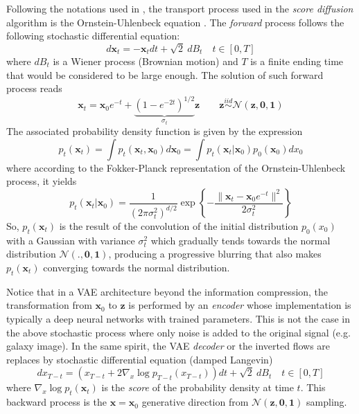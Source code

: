 \documentclass[11pt]{amsart}
\begin{document}
Following the notations used in \cite{kadkhodaie2024generalization}, the transport process used in the \textit{score diffusion} algorithm is the Ornstein-Uhlenbeck equation \citep{Uhlenbeck1930}. The \textit{forward} process follows the following stochastic differential equation:
\begin{equation}
d\bm{x}_t = -\bm{x}_t dt + \sqrt{2}\ dB_t \quad t\in[0,T]
\label{eq-Ornstein-cont}
\end{equation}
where $dB_t$ is a Wiener process (Brownian motion) and $T$ is a finite ending time that would be considered to be large enough. The solution of such forward process reads
\begin{equation}
\bm{x}_t = \bm{x}_0 e^{-t} + \underbrace{(1-e^{-2t})^{1/2}}_{\sigma_t} \bm{z} \qquad \bm{z} \overset{iid}{\sim} \mathcal{N}(\bm{z},\bm{0},\bm{1})
\end{equation}
The associated probability density function is given by the expression 
\begin{equation}
p_t(\bm{x}_t) = \int p_t(\bm{x}_t,\bm{x}_0) d\bm{x}_0 = \int p_t(\bm{x}_t|\bm{x}_0) p_0(\bm{x}_0)dx_0
\label{eq-smoothing-p0-gauss}
\end{equation}
where according to the Fokker-Planck representation of the Ornstein-Uhlenbeck process,  it yields
\begin{equation}
p_t(\bm{x}_t|\bm{x}_0)= \frac{1}{(2\pi \sigma_t^2)^{d/2}}\exp\left\{\displaystyle -\frac{\|\bm{x}_t-\bm{x}_0e^{-t}\|^2}{2\sigma_t^2}\right\}
\end{equation}
So, $p_t(\bm{x}_t)$ is the result of the convolution of the initial distribution $p_0(x_0)$ with a Gaussian with variance $\sigma_t^2$ which gradually tends towards the normal distribution $\mathcal{N}(.,\bm{0},\bm{1})$, producing a progressive blurring that also makes $p_t(\bm{x}_t)$ converging towards the normal distribution. 


Notice that in a VAE architecture beyond the information compression,  the transformation from $\bm{x}_0$ to $\bm{z}$ is performed by an \textit{encoder} whose implementation is typically a deep neural networks with trained parameters. This is not the case in the above stochastic process where only noise is added to the original signal (e.g. galaxy image). In the same spirit, the VAE \textit{decoder} or the inverted flows are replaces by stochastic differential equation (damped Langevin)
\begin{equation}
dx_{T-t} = (x_{T-t} + 2\nabla_x \log p_{T-t}(x_{T-t}))dt + \sqrt{2}\ dB_t \quad t\in[0,T]
\label{eq-backward-diffusion}
\end{equation}
where $\nabla_x \log p_{t}(\bm{x}_{t})$ is the \textit{score} of the probability density at time $t$. This backward process is the $\bm{x}=\bm{x}_0$ generative direction from $\mathcal{N}(\bm{z},\bm{0},\bm{1})$ sampling. 
\end{document}
